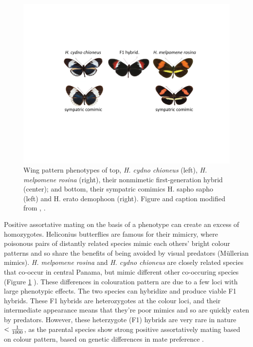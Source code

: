 \begin{figure}
\begin{center}  
  \includegraphics[width = \textwidth]{Journal_figs/alleles_genotypes/Heliconius_Merrill_assort_mating/labeled_trimmed_Heliconius_Merrill_assort_mating}
\end{center}
\caption{ Wing pattern phenotypes of top, {\it H. cydno chioneus} (left),
  {\it H. melpomene rosina} (right), their nonmimetic first-generation
  hybrid (center); and bottom, their sympatric comimics H. sapho sapho
  (left) and H. erato demophoon (right).  Figure and caption modified from \citet{merrill2019genetic},
  \PLOSccBY. }\label{fig:Heliconius_Merrill_assort}  
\end{figure}
Positive assortative mating on the basis of a phenotype can create an
excess of homozygotes. Heliconius butterflies are famous for their
mimicry, where poisonous pairs of
distantly related species mimic each others' bright colour patterns
and so share the benefits of being avoided by visual predators
(Müllerian mimics). {\it H. melpomene rosina} and {\it H. cydno chioneus} are
closely related species that co-occur in central Panama, but mimic
different other co-occuring species (Figure \ref{fig:Heliconius_Merrill_assort} ). These differences in colouration pattern
are due to a few loci with large phenotypic effects. The two species can hybridize and
produce viable F1 hybrids. These F1 hybrids are heterozygotes at the
colour loci, and their intermediate appearance means that they're poor
mimics and so are quickly eaten by predators. However, these heterzygote
(F1) hybrids are very rare in nature $< \nicefrac{1}{1000}$, as the parental species show
strong positive assortatively mating based on colour pattern, based on
genetic differences in mate preference \citet{merrill2019genetic}. 

